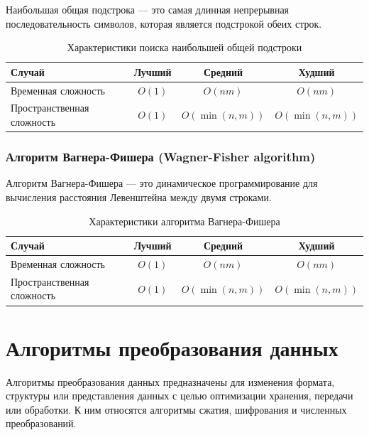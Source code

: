 \documentclass[a4paper,12pt]{article}
\begin{document}
Наибольшая общая подстрока --- это самая длинная непрерывная последовательность символов, которая является подстрокой обеих строк.

\begin{table}[H]
    \centering
    \begin{tabular}{|l|c|c|c|}
        \hline
        Случай & Лучший & Средний & Худший \\
        \hline
        Временная сложность & $O(1)$ & $O(nm)$ & $O(nm)$ \\
        \hline
        Пространственная сложность & $O(1)$ & $O(\min(n, m))$ & $O(\min(n, m))$ \\
        \hline
    \end{tabular}
    \caption{Характеристики поиска наибольшей общей подстроки}
\end{table}

\subsubsection{Алгоритм Вагнера-Фишера (Wagner-Fisher algorithm)}
\label{subsubsec:алгоритм-вагнера-фишера-wagner-fisher-algorithm}

Алгоритм Вагнера-Фишера --- это динамическое программирование для вычисления расстояния Левенштейна между двумя строками.

\begin{table}[H]
    \centering
    \begin{tabular}{|l|c|c|c|}
        \hline
        Случай & Лучший & Средний & Худший \\
        \hline
        Временная сложность & $O(1)$ & $O(nm)$ & $O(nm)$ \\
        \hline
        Пространственная сложность & $O(1)$ & $O(\min(n, m))$ & $O(\min(n, m))$ \\
        \hline
    \end{tabular}
    \caption{Характеристики алгоритма Вагнера-Фишера}
\end{table}

\section{Алгоритмы преобразования данных}
\label{sec:алгоритмы-преобразования-данных}

Алгоритмы преобразования данных предназначены для изменения формата, структуры или представления данных с целью оптимизации хранения, передачи или обработки. К ним относятся алгоритмы сжатия, шифрования и численных преобразований.
\end{document}
